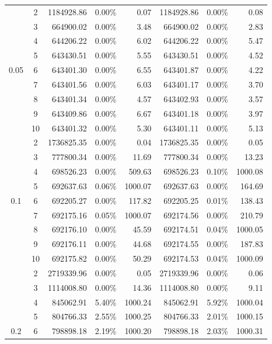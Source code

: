 {\begin{longtable}{ccrrrrrr}
			& 2     & 1184928.86 & 0.00\% & 0.07  & 1184928.86 & 0.00\% & 0.08 \\
			& 3     & 664900.02 & 0.00\% & 3.48  & 664900.02 & 0.00\% & 2.83 \\
			& 4     & 644206.22 & 0.00\% & 6.02  & 644206.22 & 0.00\% & 5.47 \\
			& 5     & 643430.51 & 0.00\% & 5.55  & 643430.51 & 0.00\% & 4.52 \\
	  0.05  & 6     & 643401.30 & 0.00\% & 6.55  & 643401.87 & 0.00\% & 4.22 \\
			& 7     & 643401.56 & 0.00\% & 6.03  & 643401.17 & 0.00\% & 3.70 \\
			& 8     & 643401.34 & 0.00\% & 4.57  & 643402.93 & 0.00\% & 3.57 \\
			& 9     & 643409.86 & 0.00\% & 6.67  & 643401.18 & 0.00\% & 3.97 \\
			& 10    & 643401.32 & 0.00\% & 5.30  & 643401.11 & 0.00\% & 5.13 \\
			& 2     & 1736825.35 & 0.00\% & 0.04  & 1736825.35 & 0.00\% & 0.05 \\
			& 3     & 777800.34 & 0.00\% & 11.69 & 777800.34 & 0.00\% & 13.23 \\
			& 4     & 698526.23 & 0.00\% & 509.63 & 698526.23 & 0.10\% & 1000.08 \\
			& 5     & 692637.63 & 0.06\% & 1000.07 & 692637.63 & 0.00\% & 164.69 \\
	  0.1   & 6     & 692205.27 & 0.00\% & 117.82 & 692205.25 & 0.01\% & 138.43 \\
			& 7     & 692175.16 & 0.05\% & 1000.07 & 692174.56 & 0.00\% & 210.79 \\
			& 8     & 692176.10 & 0.00\% & 45.59 & 692174.51 & 0.04\% & 1000.05 \\
			& 9     & 692176.11 & 0.00\% & 44.68 & 692174.55 & 0.00\% & 187.83 \\
			& 10    & 692175.82 & 0.00\% & 50.29 & 692174.53 & 0.04\% & 1000.09 \\
			& 2     & 2719339.96 & 0.00\% & 0.05  & 2719339.96 & 0.00\% & 0.06 \\
			& 3     & 1114008.80 & 0.00\% & 14.36 & 1114008.80 & 0.00\% & 9.11 \\
			& 4     & 845062.91 & 5.40\% & 1000.24 & 845062.91 & 5.92\% & 1000.04 \\
			& 5     & 804766.33 & 2.55\% & 1000.25 & 804766.33 & 2.01\% & 1000.15 \\
	  0.2   & 6     & 798898.18 & 2.19\% & 1000.20 & 798898.18 & 2.03\% & 1000.31 \\

\end{longtable}}
